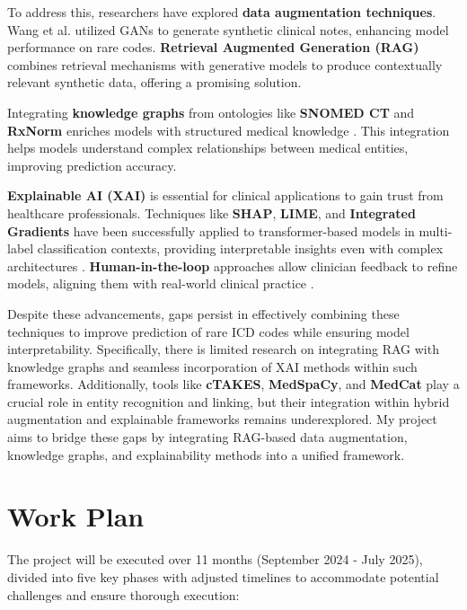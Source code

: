 \documentclass[10pt,a4paper]{article}
\begin{document}
To address this, researchers have explored \textbf{data augmentation techniques}. Wang et al. \cite{wang2019clinical} utilized GANs to generate synthetic clinical notes, enhancing model performance on rare codes. \textbf{Retrieval Augmented Generation (RAG)} combines retrieval mechanisms with generative models to produce contextually relevant synthetic data, offering a promising solution.

Integrating \textbf{knowledge graphs} from ontologies like \textbf{SNOMED CT} and \textbf{RxNorm} enriches models with structured medical knowledge \cite{gong2023explainable}. This integration helps models understand complex relationships between medical entities, improving prediction accuracy.

\textbf{Explainable AI (XAI)} is essential for clinical applications to gain trust from healthcare professionals. Techniques like \textbf{SHAP}, \textbf{LIME}, and \textbf{Integrated Gradients} have been successfully applied to transformer-based models in multi-label classification contexts, providing interpretable insights even with complex architectures \cite{fantozzi2024explainability, volkov2024local, szczepanski2021new, gucukbel2023evaluating}. \textbf{Human-in-the-loop} approaches allow clinician feedback to refine models, aligning them with real-world clinical practice \cite{panda2023clinician}.

Despite these advancements, gaps persist in effectively combining these techniques to improve prediction of rare ICD codes while ensuring model interpretability. Specifically, there is limited research on integrating RAG with knowledge graphs and seamless incorporation of XAI methods within such frameworks. Additionally, tools like \textbf{cTAKES}, \textbf{MedSpaCy}, and \textbf{MedCat} play a crucial role in entity recognition and linking, but their integration within hybrid augmentation and explainable frameworks remains underexplored. My project aims to bridge these gaps by integrating RAG-based data augmentation, knowledge graphs, and explainability methods into a unified framework.

\section{Work Plan}
The project will be executed over 11 months (September 2024 - July 2025), divided into five key phases with adjusted timelines to accommodate potential challenges and ensure thorough execution:
\end{document}
